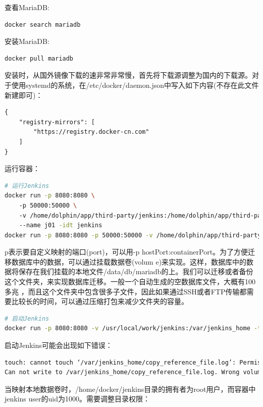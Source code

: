 \documentclass[8pt]{book}
\numberwithin{dummy}{section}
\theoremstyle{ocrenumbox}
\theoremstyle{blacknumex}
\theoremstyle{blacknumbox}
\theoremstyle{ocrenum}
\begin{document}
查看MariaDB:

\begin{lstlisting}[language=Bash]
docker search mariadb
\end{lstlisting}

安装MariaDB:

\begin{lstlisting}[language=Bash]
docker pull mariadb
\end{lstlisting}

安装时，从国外镜像下载的速非常非常慢，首先将下载源调整为国内的下载源。对于使用systemd的系统，在/etc/docker/daemon.json中写入如下内容(不存在此文件新建即可)：

\begin{lstlisting}
{
	"registry-mirrors": [
		"https://registry.docker-cn.com"
	]
}
\end{lstlisting}

运行容器：

\begin{lstlisting}[language=Bash]
# 运行Jenkins
docker run -p 8080:8080 \ 
	-p 50000:50000 \ 
	-v /home/dolphin/app/third-party/jenkins:/home/dolphin/app/third-party/jenkins/jenkins_home \ 
	--name j01 -idt jenkins
docker run -p 8080:8080 -p 50000:50000 -v /home/dolphin/app/third-party/jenkins:/home/dolphin/app/third-party/jenkins/jenkins_home jenkins
\end{lstlisting}

p表示要自定义映射的端口(port)，可以用-p hostPort:containerPort。为了方便迁移数据库中的数据，可以通过挂载数据卷(volum	e)来实现。这样，数据库中的数据将保存在我们挂载的本地文件/data/db/mariadb的上。我们可以迁移或者备份这个文件夹，来实现数据库迁移。一般一个自动生成的空数据库文件，大概有100多兆 ，而且这个文件夹中包含很多子文件，因此如果通过SSH或者FTP传输都需要比较长的时间，可以通过压缩打包来减少文件夹的容量。

\begin{lstlisting}[language=Bash]
# 启动Jenkins
docker run -p 8080:8080 -v /usr/local/work/jenkins:/var/jenkins_home -t jenkins
\end{lstlisting}

启动Jenkins可能会出现如下错误：

\begin{lstlisting}[language=Bash]
touch: cannot touch ‘/var/jenkins_home/copy_reference_file.log’: Permission denied
Can not write to /var/jenkins_home/copy_reference_file.log. Wrong volume permissions?
\end{lstlisting}

当映射本地数据卷时，/home/docker/jenkins目录的拥有者为root用户，而容器中jenkins user的uid为1000。需要调整目录权限：
\end{document}
